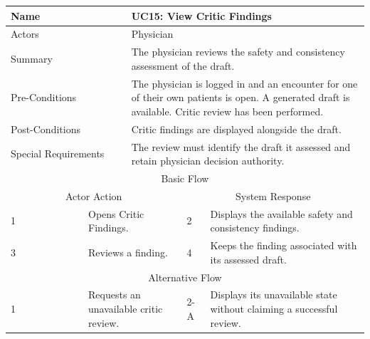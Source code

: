 \begin{reporttable}
\centering
\small
\caption{UC15: View Critic Findings.}
\label{tab:kashaf:uc15}
\begin{tabular}{|p{}|p{}|p{}|p{}|p{}|}
\hline
\multicolumn{2}{|p{\dimexpr0.225\textwidth+2\tabcolsep+\arrayrulewidth\relax}|}{Name} & \multicolumn{3}{p{\dimexpr0.575\textwidth+4\tabcolsep+2\arrayrulewidth\relax}|}{UC15: View Critic Findings} \\ \hline
\multicolumn{2}{|p{\dimexpr0.225\textwidth+2\tabcolsep+\arrayrulewidth\relax}|}{Actors} & \multicolumn{3}{p{\dimexpr0.575\textwidth+4\tabcolsep+2\arrayrulewidth\relax}|}{Physician} \\ \hline
\multicolumn{2}{|p{\dimexpr0.225\textwidth+2\tabcolsep+\arrayrulewidth\relax}|}{Summary} & \multicolumn{3}{p{\dimexpr0.575\textwidth+4\tabcolsep+2\arrayrulewidth\relax}|}{The physician reviews the safety and consistency assessment of the draft.} \\ \hline
\multicolumn{2}{|p{\dimexpr0.225\textwidth+2\tabcolsep+\arrayrulewidth\relax}|}{Pre-Conditions} & \multicolumn{3}{p{\dimexpr0.575\textwidth+4\tabcolsep+2\arrayrulewidth\relax}|}{The physician is logged in and an encounter for one of their own patients is open. A generated draft is available. Critic review has been performed.} \\ \hline
\multicolumn{2}{|p{\dimexpr0.225\textwidth+2\tabcolsep+\arrayrulewidth\relax}|}{Post-Conditions} & \multicolumn{3}{p{\dimexpr0.575\textwidth+4\tabcolsep+2\arrayrulewidth\relax}|}{Critic findings are displayed alongside the draft.} \\ \hline
\multicolumn{2}{|p{\dimexpr0.225\textwidth+2\tabcolsep+\arrayrulewidth\relax}|}{Special Requirements} & \multicolumn{3}{p{\dimexpr0.575\textwidth+4\tabcolsep+2\arrayrulewidth\relax}|}{The review must identify the draft it assessed and retain physician decision authority.} \\ \hline
\multicolumn{5}{|c|}{Basic Flow} \\ \hline
\multicolumn{3}{|c|}{Actor Action} & \multicolumn{2}{c|}{System Response} \\ \hline
1 & \multicolumn{2}{p{\dimexpr0.37\textwidth+2\tabcolsep+\arrayrulewidth\relax}|}{Opens Critic Findings.} & 2 & Displays the available safety and consistency findings. \\ \hline
3 & \multicolumn{2}{p{\dimexpr0.37\textwidth+2\tabcolsep+\arrayrulewidth\relax}|}{Reviews a finding.} & 4 & Keeps the finding associated with its assessed draft. \\ \hline
\multicolumn{5}{|c|}{Alternative Flow} \\ \hline
1 & \multicolumn{2}{p{\dimexpr0.37\textwidth+2\tabcolsep+\arrayrulewidth\relax}|}{Requests an unavailable critic review.} & 2-A & Displays its unavailable state without claiming a successful review. \\ \hline
\end{tabular}
\end{reporttable}

